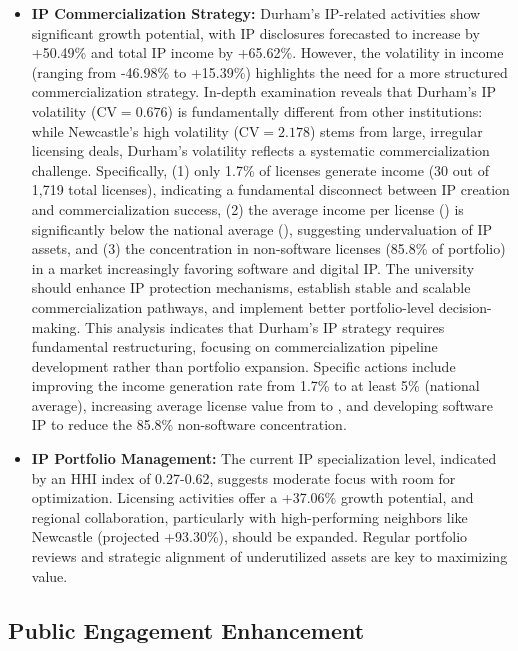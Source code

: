 \documentclass[journal,onecolumn, 10pt,draftclsnofoot]{IEEEtran}
\begin{document}
\begin{itemize}
    \item \textbf{IP Commercialization Strategy:} Durham's IP-related activities show significant growth potential, with IP disclosures forecasted to increase by +50.49\% and total IP income by +65.62\%. However, the volatility in income (ranging from -46.98\% to +15.39\%) highlights the need for a more structured commercialization strategy. In-depth examination reveals that Durham's IP volatility ($\mathrm{CV}=0.676$) is fundamentally different from other institutions: while Newcastle's high volatility ($\mathrm{CV}=2.178$) stems from large, irregular licensing deals, Durham's volatility reflects a systematic commercialization challenge. Specifically, (1) only 1.7\% of licenses generate income (30 out of 1,719 total licenses), indicating a fundamental disconnect between IP creation and commercialization success, (2) the average income per license () is significantly below the national average (), suggesting undervaluation of IP assets, and (3) the concentration in non-software licenses (85.8\% of portfolio) in a market increasingly favoring software and digital IP. The university should enhance IP protection mechanisms, establish stable and scalable commercialization pathways, and implement better portfolio-level decision-making. This analysis indicates that Durham's IP strategy requires fundamental restructuring, focusing on commercialization pipeline development rather than portfolio expansion. Specific actions include improving the income generation rate from 1.7\% to at least 5\% (national average), increasing average license value from  to , and developing software IP to reduce the 85.8\% non-software concentration.
    
    \item \textbf{IP Portfolio Management:} The current IP specialization level, indicated by an HHI index of 0.27-0.62, suggests moderate focus with room for optimization. Licensing activities offer a +37.06\% growth potential, and regional collaboration, particularly with high-performing neighbors like Newcastle (projected +93.30\%), should be expanded. Regular portfolio reviews and strategic alignment of underutilized assets are key to maximizing value.
\end{itemize}

\subsection{Public Engagement Enhancement}
\end{document}
